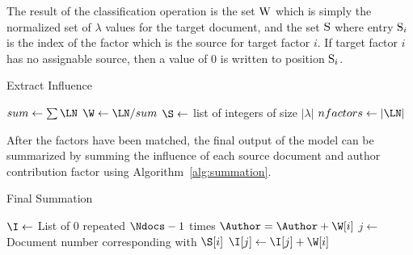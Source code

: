 \documentclass[../ut-dissertation.tex]{subfiles}
\begin{document}
The result of the classification operation is the set $\mathrm{W}$ which
is simply the normalized set of $\lambda$ values for the target
document, and the set $\mathrm{S}$ where entry $\mathrm{S}_i$ is the index
of the factor which is the source for target factor $i$.  If target
factor $i$ has no assignable source, then a value of 0 is written to
position $\mathrm{S}_i$.

\begin{algorithm}[p]
  \caption{Extract Influence}
  \label{alg:influence}
   
   
  
  \Output{\W, \S}
  \BlankLine
  $sum \leftarrow \sum \LN$\;
  $\W \leftarrow \LN / sum$\;
  $\S \leftarrow$ list of integers of size $|\lambda|$\;
  $nfactors \leftarrow |\LN|$\;
  \Return{\W, \S}\;
\end{algorithm}

After the factors have been matched, the final output of the model can
be summarized by summing the influence of each source document and
author contribution factor using Algorithm~\ref{alg:summation}.

\begin{algorithm}[p]
  \caption{Final Summation}
  \label{alg:summation}
   
   
  
  \Input{\Ndocs, \S, \W}
  \Output{\I, \Author}
  \BlankLine
  $\I \leftarrow $ List of 0 repeated $\Ndocs-1$ times\;
   {
     {
      $\Author = \Author + \W[i]$\;
    }{
      $j \leftarrow $ Document number corresponding with $\S[i]$\;
      $\I[j] \leftarrow \I[j] + \W[i]$\;
    }
  }
\end{algorithm}
\end{document}
